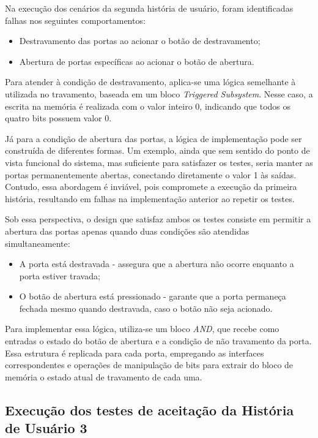 Na execução dos cenários da segunda história de usuário, foram identificadas falhas nos seguintes comportamentos:

\begin{itemize}
	\item Destravamento das portas ao acionar o botão de destravamento;
	\item Abertura de portas específicas ao acionar o botão de abertura.
\end{itemize}

Para atender à condição de destravamento, aplica-se uma lógica semelhante à utilizada no travamento, baseada em um bloco \textit{Triggered Subsystem}. Nesse caso, 
a escrita na memória é realizada com o valor inteiro 0, indicando que todos os quatro bits possuem valor 0.

Já para a condição de abertura das portas, a lógica de implementação pode ser construída de diferentes formas. Um exemplo, ainda que sem sentido do ponto de vista 
funcional do sistema, mas suficiente para satisfazer os testes, seria manter as portas permanentemente abertas, conectando diretamente o valor 1 às saídas. Contudo, 
essa abordagem é inviável, pois compromete a execução da primeira história, resultando em falhas na implementação anterior ao repetir os testes.

Sob essa perspectiva, o design que satisfaz ambos os testes consiste em permitir a abertura das portas apenas quando duas condições são atendidas simultaneamente:

\begin{itemize}
	\item A porta está destravada - assegura que a abertura não ocorre enquanto a porta estiver travada;
	\item O botão de abertura está pressionado - garante que a porta permaneça fechada mesmo quando destravada, caso o botão não seja acionado.
\end{itemize}

Para implementar essa lógica, utiliza-se um bloco \textit{AND}, que recebe como entradas o estado do botão de abertura e a condição de não travamento da porta. Essa 
estrutura é replicada para cada porta, empregando as interfaces correspondentes e operações de manipulação de bits para extrair do bloco de memória o estado atual 
de travamento de cada uma.


\subsection{Execução dos testes de aceitação da História de Usuário 3}

